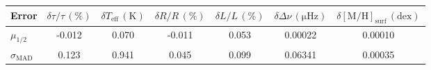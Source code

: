 \begin{tabular}{lcccccc}
\toprule
Error &  $\delta \tau/\tau\,(\%)$ &  $\delta T_\mathrm{eff}\,(\mathrm{K})$ &  $\delta R/R\,(\%)$ &  $\delta L/L\,(\%)$ &  $\delta \Delta\nu\,(\mathrm{\mu Hz})$ &  $\delta [\mathrm{M}/\mathrm{H}]_\mathrm{surf}\,(\mathrm{dex})$ \\
\midrule
$\mu_{1/2}$           &                    -0.012 &                                  0.070 &              -0.011 &               0.053 &                                0.00022 &                                                         0.00010 \\
$\sigma_\mathrm{MAD}$ &                     0.123 &                                  0.941 &               0.045 &               0.099 &                                0.06341 &                                                         0.00035 \\
\bottomrule
\end{tabular}
